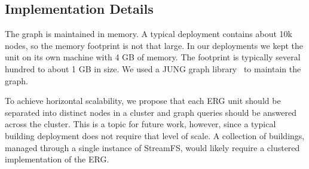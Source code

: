 \subsection{Implementation Details}
The graph is maintained in memory.  A typical deployment contains about 10k nodes, so the memory footprint is not that large. 
In our deployments we kept the unit on its own machine with 4 GB of memory.  The footprint is typically several hundred to
about 1 GB in size.  We used a JUNG graph library~\cite{jung} to maintain the graph.

To achieve horizontal scalability, we propose that each ERG unit should be separated into distinct nodes in
a cluster and graph queries should be answered across the cluster.  This is a topic for future work, however, since a typical
building deployment does not require that level of scale.  A collection of buildings, managed through
a single instance of StreamFS, would likely require a clustered implementation of the ERG.















